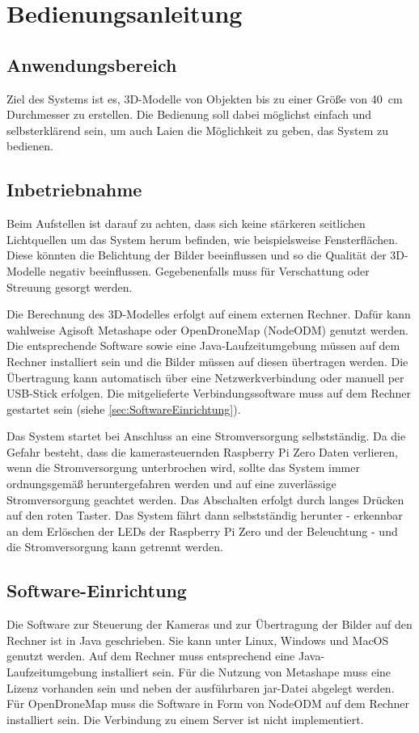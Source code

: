 \documentclass[./00PhotoBox.tex]{subfiles}
\begin{document}
\chapter{Bedienungsanleitung}
\label{ch:Bedienungsanleitung}


\section{Anwendungsbereich}
Ziel des Systems ist es, 3D-Modelle von Objekten bis zu einer Größe von 40~cm Durchmesser zu erstellen. Die Bedienung soll dabei möglichst einfach und selbsterklärend sein, um auch Laien die Möglichkeit zu geben, das System zu bedienen.

\section{Inbetriebnahme}
Beim Aufstellen ist darauf zu achten, dass sich keine stärkeren seitlichen Lichtquellen um das System herum befinden, wie beispielsweise Fensterflächen. Diese könnten die Belichtung der Bilder beeinflussen und so die Qualität der 3D-Modelle negativ beeinflussen. Gegebenenfalls muss für Verschattung oder Streuung gesorgt werden. 

Die Berechnung des 3D-Modelles erfolgt auf einem externen Rechner. Dafür kann wahlweise Agisoft Metashape oder OpenDroneMap (NodeODM) genutzt werden. Die entsprechende Software sowie eine Java-Laufzeitumgebung müssen auf dem Rechner installiert sein und die Bilder müssen auf diesen übertragen werden. Die Übertragung kann automatisch über eine Netzwerkverbindung oder manuell per USB-Stick erfolgen. Die mitgelieferte Verbindungssoftware muss auf dem Rechner gestartet sein (siehe \autoref{sec:SoftwareEinrichtung}).

Das System startet bei Anschluss an eine Stromversorgung selbstständig. Da die Gefahr besteht, dass die kamerasteuernden Raspberry Pi Zero Daten verlieren, wenn die Stromversorgung unterbrochen wird, sollte das System immer ordnungsgemäß heruntergefahren werden und auf eine zuverlässige Stromversorgung geachtet werden.
Das Abschalten erfolgt durch langes Drücken auf den roten Taster. Das System fährt dann selbstständig herunter - erkennbar an dem Erlöschen der LEDs der Raspberry Pi Zero und der Beleuchtung - und die Stromversorgung kann getrennt werden.

\section{Software-Einrichtung}
\label{sec:SoftwareEinrichtung}
Die Software zur Steuerung der Kameras und zur Übertragung der Bilder auf den Rechner ist in Java geschrieben. Sie kann unter Linux, Windows und MacOS genutzt werden. Auf dem Rechner muss entsprechend eine Java-Laufzeitumgebung installiert sein. Für die Nutzung von Metashape muss eine Lizenz vorhanden sein und neben der ausführbaren jar-Datei abgelegt werden. Für OpenDroneMap muss die Software in Form von NodeODM auf dem Rechner installiert sein. Die Verbindung zu einem Server ist nicht implementiert.
\end{document}
